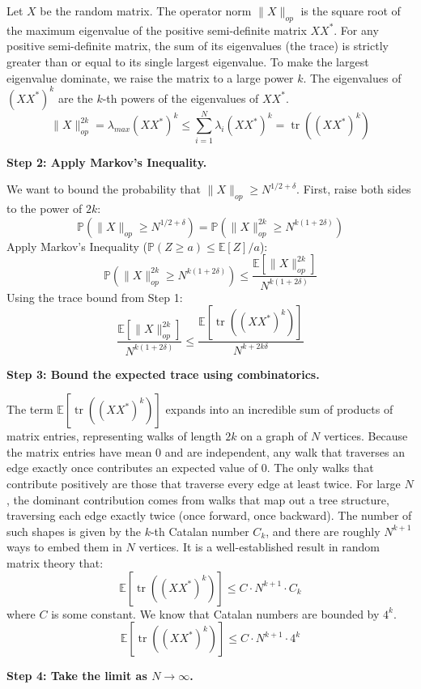 \begin{solution}
Let $X$ be the random matrix. The operator norm $\|X\|_{op}$ is the square root of the maximum eigenvalue of the positive semi-definite matrix $X X^*$.
For any positive semi-definite matrix, the sum of its eigenvalues (the trace) is strictly greater than or equal to its single largest eigenvalue.
To make the largest eigenvalue dominate, we raise the matrix to a large power $k$. The eigenvalues of $(X X^*)^k$ are the $k$-th powers of the eigenvalues of $X X^*$.
\[ \|X\|_{op}^{2k} = \lambda_{max}(X X^*)^k \leq \sum_{i=1}^N \lambda_i(X X^*)^k = \operatorname{tr}((X X^*)^k) \]

\textbf{Step 2: Apply Markov's Inequality.}

We want to bound the probability that $\|X\|_{op} \geq N^{1/2 + \delta}$.
First, raise both sides to the power of $2k$:
\[ \mathbb{P}(\|X\|_{op} \geq N^{1/2+\delta}) = \mathbb{P}\left(\|X\|_{op}^{2k} \geq N^{k(1+2\delta)}\right) \]
Apply Markov's Inequality ($\mathbb{P}(Z \geq a) \leq \mathbb{E}[Z]/a$):
\[ \mathbb{P}\left(\|X\|_{op}^{2k} \geq N^{k(1+2\delta)}\right) \leq \frac{\mathbb{E}[\|X\|_{op}^{2k}]}{N^{k(1+2\delta)}} \]
Using the trace bound from Step 1:
\[ \frac{\mathbb{E}[\|X\|_{op}^{2k}]}{N^{k(1+2\delta)}} \leq \frac{\mathbb{E}[\operatorname{tr}((X X^*)^k)]}{N^{k+2k\delta}} \]

\textbf{Step 3: Bound the expected trace using combinatorics.}

The term $\mathbb{E}[\operatorname{tr}((X X^*)^k)]$ expands into an incredible sum of products of matrix entries, representing walks of length $2k$ on a graph of $N$ vertices.
Because the matrix entries have mean 0 and are independent, any walk that traverses an edge exactly once contributes an expected value of 0. The only walks that contribute positively are those that traverse every edge at least twice.
For large $N$, the dominant contribution comes from walks that map out a tree structure, traversing each edge exactly twice (once forward, once backward). The number of such shapes is given by the $k$-th Catalan number $C_k$, and there are roughly $N^{k+1}$ ways to embed them in $N$ vertices.
It is a well-established result in random matrix theory that:
\[ \mathbb{E}[\operatorname{tr}((X X^*)^k)] \leq C \cdot N^{k+1} \cdot C_k \]
where $C$ is some constant. We know that Catalan numbers are bounded by $4^k$.
\[ \mathbb{E}[\operatorname{tr}((X X^*)^k)] \leq C \cdot N^{k+1} \cdot 4^k \]

\textbf{Step 4: Take the limit as $N \to \infty$.}


\end{solution}
